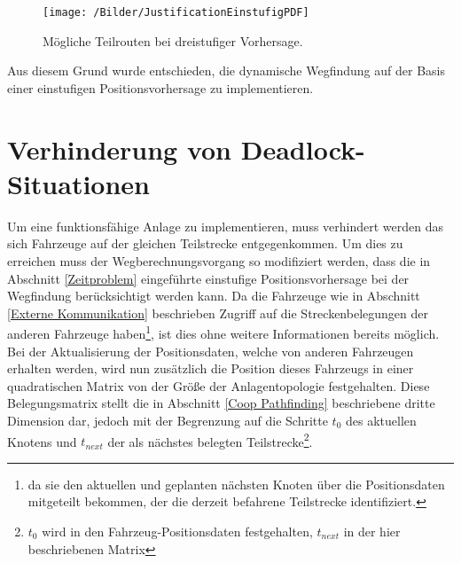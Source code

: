 		\begin{figure}[h]
			\centering
			\texttt{[image: /Bilder/JustificationEinstufigPDF]}
			\vspace{0.2cm}
			\caption{Mögliche Teilrouten bei dreistufiger Vorhersage.}\label{Einstufig}
		\end{figure}
		
		Aus diesem Grund wurde entschieden, die dynamische Wegfindung auf der Basis einer einstufigen Positionsvorhersage zu implementieren.
		
\section{Verhinderung von Deadlock-Situationen}
	\label{Deadlock Verhindern}
	Um eine funktionsfähige Anlage zu implementieren, muss verhindert werden das sich Fahrzeuge auf der gleichen Teilstrecke entgegenkommen. Um dies zu erreichen muss der Wegberechnungsvorgang so modifiziert werden, dass die in Abschnitt \ref{Zeitproblem} eingeführte einstufige Positionsvorhersage bei der Wegfindung berücksichtigt werden kann. Da die Fahrzeuge wie in Abschnitt \ref{Externe Kommunikation} beschrieben Zugriff auf die Streckenbelegungen der anderen Fahrzeuge haben\footnote{da sie den aktuellen und geplanten nächsten Knoten über die Positionsdaten mitgeteilt bekommen, der die derzeit befahrene Teilstrecke identifiziert.}, ist dies ohne weitere Informationen bereits möglich. Bei der Aktualisierung der Positionsdaten, welche von anderen Fahrzeugen erhalten werden, wird nun zusätzlich die Position dieses Fahrzeugs in einer quadratischen Matrix von der Größe der Anlagentopologie festgehalten. Diese Belegungsmatrix stellt die in Abschnitt \ref{Coop Pathfinding} beschriebene dritte Dimension dar, jedoch mit der Begrenzung auf die Schritte $t_0$ des aktuellen Knotens und $t_{next}$ der als nächstes belegten Teilstrecke\footnote{$t_0$ wird in den Fahrzeug-Positionsdaten festgehalten, $t_{next}$ in der hier beschriebenen Matrix}.

